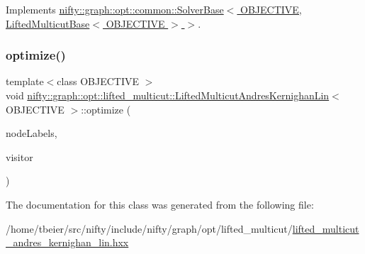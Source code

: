 Implements \hyperlink{classnifty_1_1graph_1_1opt_1_1common_1_1SolverBase_a55e9eb645c07d6e0782ebfb990ab3c84}{nifty\+::graph\+::opt\+::common\+::\+Solver\+Base$<$ O\+B\+J\+E\+C\+T\+I\+V\+E, Lifted\+Multicut\+Base$<$ O\+B\+J\+E\+C\+T\+I\+V\+E $>$ $>$}.

\mbox{\label{classnifty_1_1graph_1_1opt_1_1lifted__multicut_1_1LiftedMulticutAndresKernighanLin_ad5c474165f5364bce7f461f83894a100}} 
\subsubsection{\texorpdfstring{optimize()}{optimize()}}
{\footnotesize\ttfamily template$<$class O\+B\+J\+E\+C\+T\+I\+VE $>$ \\
void \hyperlink{classnifty_1_1graph_1_1opt_1_1lifted__multicut_1_1LiftedMulticutAndresKernighanLin}{nifty\+::graph\+::opt\+::lifted\+\_\+multicut\+::\+Lifted\+Multicut\+Andres\+Kernighan\+Lin}$<$ O\+B\+J\+E\+C\+T\+I\+VE $>$\+::optimize (\begin{DoxyParamCaption}\item[{\hyperlink{classnifty_1_1graph_1_1opt_1_1lifted__multicut_1_1LiftedMulticutAndresKernighanLin_a93990ac2b7ec99743b4765134a76ffe0}{Node\+Labels\+Type} \&}]{node\+Labels,  }\item[{\hyperlink{classnifty_1_1graph_1_1opt_1_1lifted__multicut_1_1LiftedMulticutAndresKernighanLin_abce2decf7c7b89756c9acdfd70b8dc22}{Visitor\+Base\+Type} $\ast$}]{visitor }\end{DoxyParamCaption})\hspace{0.3cm}{\ttfamily [virtual]}}



The documentation for this class was generated from the following file\+:\begin{DoxyCompactItemize}
\item 
/home/tbeier/src/nifty/include/nifty/graph/opt/lifted\+\_\+multicut/\hyperlink{lifted__multicut__andres__kernighan__lin_8hxx}{lifted\+\_\+multicut\+\_\+andres\+\_\+kernighan\+\_\+lin.\+hxx}\end{DoxyCompactItemize}
